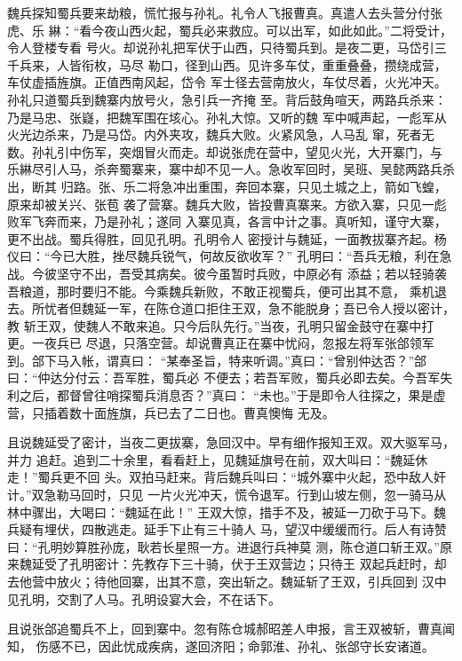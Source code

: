 魏兵探知蜀兵要来劫粮，慌忙报与孙礼。礼令人飞报曹真。真遣人去头营分付张虎、乐
綝：“看今夜山西火起，蜀兵必来救应。可以出军，如此如此。”二将受计，令人登楼专看
号火。却说孙礼把军伏于山西，只待蜀兵到。是夜二更，马岱引三千兵来，人皆衔枚，马尽
勒口，径到山西。见许多车仗，重重叠叠，攒绕成营，车仗虚插旌旗。正值西南风起，岱令
军士径去营南放火，车仗尽着，火光冲天。孙礼只道蜀兵到魏寨内放号火，急引兵一齐掩
至。背后鼓角喧天，两路兵杀来：乃是马忠、张嶷，把魏军围在垓心。孙礼大惊。又听的魏
军中喊声起，一彪军从火光边杀来，乃是马岱。内外夹攻，魏兵大败。火紧风急，人马乱
窜，死者无数。孙礼引中伤军，突烟冒火而走。却说张虎在营中，望见火光，大开寨门，与
乐綝尽引人马，杀奔蜀寨来，寨中却不见一人。急收军回时，吴班、吴懿两路兵杀出，断其
归路。张、乐二将急冲出重围，奔回本寨，只见土城之上，箭如飞蝗，原来却被关兴、张苞
袭了营寨。魏兵大败，皆投曹真寨来。方欲入寨，只见一彪败军飞奔而来，乃是孙礼；遂同
入寨见真，各言中计之事。真听知，谨守大寨，更不出战。蜀兵得胜，回见孔明。孔明令人
密授计与魏延，一面教拔寨齐起。杨仪曰：“今已大胜，挫尽魏兵锐气，何故反欲收军？”
孔明曰：“吾兵无粮，利在急战。今彼坚守不出，吾受其病矣。彼今虽暂时兵败，中原必有
添益；若以轻骑袭吾粮道，那时要归不能。今乘魏兵新败，不敢正视蜀兵，便可出其不意，
乘机退去。所忧者但魏延一军，在陈仓道口拒住王双，急不能脱身；吾已令人授以密计，教
斩王双，使魏人不敢来追。只今后队先行。”当夜，孔明只留金鼓守在寨中打更。一夜兵已
尽退，只落空营。却说曹真正在寨中忧闷，忽报左将军张郃领军到。郃下马入帐，谓真曰：
“某奉圣旨，特来听调。”真曰：“曾别仲达否？”郃曰：“仲达分付云：吾军胜，蜀兵必
不便去；若吾军败，蜀兵必即去矣。今吾军失利之后，都督曾往哨探蜀兵消息否？”真曰：
“未也。”于是即令人往探之，果是虚营，只插着数十面旌旗，兵已去了二日也。曹真懊悔
无及。

且说魏延受了密计，当夜二更拔寨，急回汉中。早有细作报知王双。双大驱军马，并力
追赶。追到二十余里，看看赶上，见魏延旗号在前，双大叫曰：“魏延休走！”蜀兵更不回
头。双拍马赶来。背后魏兵叫曰：“城外寨中火起，恐中敌人奸计。”双急勒马回时，只见
一片火光冲天，慌令退军。行到山坡左侧，忽一骑马从林中骤出，大喝曰：“魏延在此！”
王双大惊，措手不及，被延一刀砍于马下。魏兵疑有埋伏，四散逃走。延手下止有三十骑人
马，望汉中缓缓而行。后人有诗赞曰：“孔明妙算胜孙庞，耿若长星照一方。进退行兵神莫
测，陈仓道口斩王双。”原来魏延受了孔明密计：先教存下三十骑，伏于王双营边；只待王
双起兵赶时，却去他营中放火；待他回寨，出其不意，突出斩之。魏延斩了王双，引兵回到
汉中见孔明，交割了人马。孔明设宴大会，不在话下。

且说张郃追蜀兵不上，回到寨中。忽有陈仓城郝昭差人申报，言王双被斩，曹真闻知，
伤感不已，因此忧成疾病，遂回济阳；命郭淮、孙礼、张郃守长安诸道。

